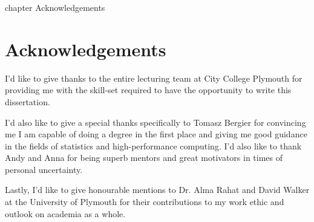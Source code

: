 \cleardoublepage
{}
{}
    {chapter}
    {Acknowledgements}

\chapter*{Acknowledgements}
I'd like to give thanks to the entire lecturing team at City College Plymouth for providing me with the skill-set required to have the opportunity to write this dissertation.

I'd also like to give a special thanks specifically to Tomasz Bergier for convincing me I am capable of doing a degree in the first place and giving me good guidance in the fields of statistics and high-performance computing. I'd also like to thank Andy and Anna for being superb mentors and great motivators in times of personal uncertainty.

Lastly, I'd like to give honourable mentions to Dr. Alma Rahat and David Walker at the University of Plymouth for their contributions to my work ethic and outlook on academia as a whole.
